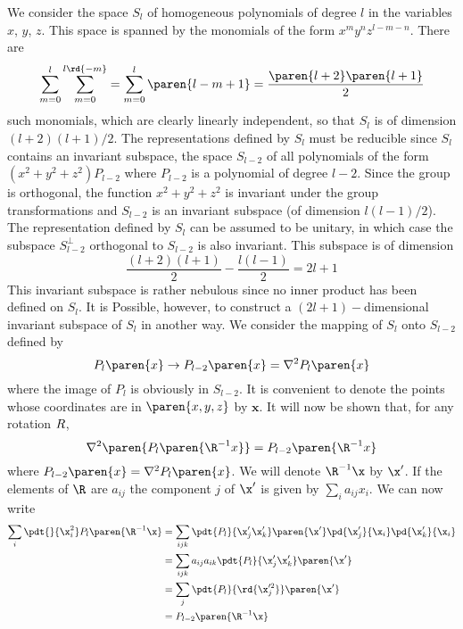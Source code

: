 We consider the space $S_{l}$ of homogeneous polynomials of degree $l$ in the variables $x$, $y$, $z$. This space is spanned by the monomials of the form $x^{m}y^{n}z^{l-m-n}$. There are
\begin{equation*}
  \sum_{m=0}^{l} \sum_{m=0}^{l{\rd{ -m }}} =
  \sum_{m=0}^{l} \paren{l - m + 1} =
  \frac{\paren{l + 2} \paren{l + 1}} {2}
\end{equation*}
such monomials, which are clearly linearly independent, so that $S_{l}$ is of dimension $(l + 2)(l + 1)/2$. The representations defined by $S_{l}$ must be reducible since $S_{l}$ contains an invariant subspace, the space $S_{l-2}$ of all polynomials of the form $(x^{2}+y^{2}+z^{2}) P_{l-2}$ where $P_{l-2}$ is a polynomial of degree $l-2$. Since the group is orthogonal, the function $x^{2}+ y^{2} + z^{2}$ is invariant under the group transformations and $S_{l-2}$ is an invariant subspace (of dimension $l( l - 1)/ 2$).	The representation defined by $S_{l}$ can be assumed to be unitary, in which case the subspace $S_{l-2}^{\perp}$ orthogonal to $S_{l-2}$ is also invariant. This subspace is of dimension
\begin{equation*}
  \frac{(l + 2)(l + 1)} {2} - \frac{l(l - 1)}{2} = 2l + 1
\end{equation*}
This invariant subspace is rather nebulous since no inner product has been defined on $S_{l}$. It is Possible, however, to construct a $(2l + 1)-$dimensional invariant subspace of $S_{l}$ in another way. We consider the mapping of $S_{l}$ onto $S_{l-2}$ defined by
\begin{equation*}
  P_{l}\paren{x} \rightarrow  P_{l-2}\paren{x} = \nabla^{2} P_{l}\paren{x}
\end{equation*}
where the image of $P_{l}$ is obviously in $S_{l-2}$. It is convenient to denote the points whose coordinates are in $\paren{x,y,z}$ by $\textbf{x}$. It will now be shown that, for any rotation $\\R$,
\begin{equation*}
  \nabla^{2} \paren{P_{l}\paren{\R^{-1}x}} = P_{l-2}\paren{\R^{-1}x}
\end{equation*}
where $P_{l-2}\paren{x} = \nabla^{2} P_{l}\paren{x}$. We will denote $\R^{-1}\x$ by $\x'$. If the elements of $\R$ are $a_{ij}$ the component $j$ of $\x'$ is given by $\sum_{i} a_{ij} 
x_{i}$. We can now write
\begin{equation*}
  \begin{split}
    \sum_{i} \pdt{}{\x_{i}^{2}} P_{l}\paren{\R^{-1} \x}  &=
    \sum_{ijk} \pdt{P_{l}} {\x_{j}' \x_{k}'} \paren{\x'} \pd{\x_{j}'}{\x_{i}} \pd{\x_{k}'}{\x_{i}} \\
    &=\sum_{ijk} a_{ij} a_{ik} \pdt{P_{l}}{\x_{j}' \x_{k}'} \paren{\x'} \\ 
    &=\sum_{j} \pdt{P_{l}}{{\rd{ \x_{j}'^{2} }}} \paren{\x'} \\ 
    &= P_{l-2} \paren{\R^{-1}\x} 
  \end{split}
\end{equation*}
